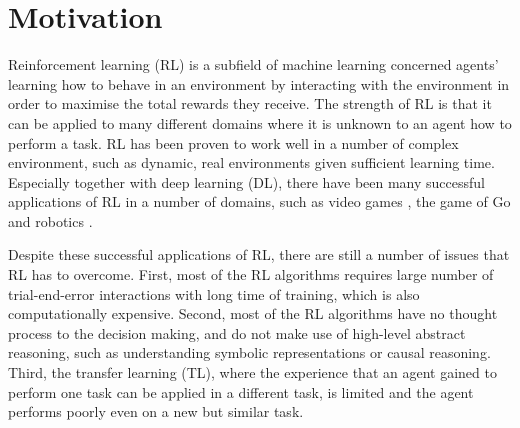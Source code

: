 \section{Motivation}
\label{sec:motivation}
Reinforcement learning (RL) is a subfield of machine learning concerned agents' learning how to behave in an environment by interacting with the environment in order to maximise the total rewards they receive.
The strength of RL is that it can be applied to many different domains where it is unknown to an agent how to perform a task. 
RL has been proven to work well in a number of complex environment, such as dynamic, real environments given sufficient learning time.
Especially together with deep learning (DL), there have been many successful applications of RL in a number of domains,
such as video games \cite{Mnih2015}, the game of Go \cite{Silver2016} and robotics \cite{Levine2015}. 

Despite these successful applications of RL, there are still a number of issues that RL has to overcome.
First, most of the RL algorithms requires large number of trial-end-error interactions with long time of training, which is also computationally expensive.
Second, most of the RL algorithms have no thought process to the decision making, and do not make use of high-level abstract reasoning, 
such as understanding symbolic representations or causal reasoning.
Third, the transfer learning (TL), where the experience that an agent gained to perform one task can be applied in a different task, is limited and the agent performs poorly even on a new but similar task. 


